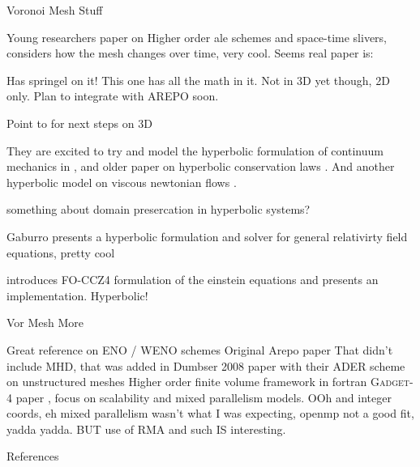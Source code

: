 \documentclass{beamer}
\begin{document}
\begin{frame}{Voronoi Mesh Stuff}
  \begin{outline}
    \1 \cite{Gaburro2021High} Young researchers paper on Higher order ale schemes and space-time slivers, considers how the mesh changes over time, very cool. Seems real paper is:

    \1 \cite{Gaburro2020High} Has springel on it! This one has all the math in it. Not in 3D yet though, 2D only. Plan to integrate with AREPO soon.

    \2 Point to \cite{Re2017Interpolation} for next steps on 3D

    \2 They are excited to try and model the hyperbolic formulation of continuum mechanics in \cite{Dumbser2016High}, and older paper on hyperbolic conservation laws \cite{Dumbser2011Universal}. And another hyperbolic model on viscous newtonian flows \cite{Peshkov2016Hyperbolic}.

    \2 \cite{Guermond2018Second} something about domain presercation in hyperbolic systems?

  \1 \cite{Gaburro2021Well} Gaburro presents a hyperbolic formulation and solver for general relativirty field equations, pretty cool

  \1 \cite{Dumbser2018Conformal} introduces FO-CCZ4 formulation of the einstein equations and presents an implementation. Hyperbolic!

    
  \end{outline}
\end{frame}

\begin{frame}{Vor Mesh More}
\begin{outline}
  \1 Great reference on ENO / WENO schemes \cite{zhang2016eno}
  \1 Original Arepo paper \cite{Springel2010Pur}
  \1 That didn't include MHD, that was added in \cite{pakmor2011mhd}
  \1 Dumbser 2008 paper with their ADER scheme \cite{dumbser2008unified} on unstructured meshes
  \1 Higher order finite volume framework in fortran \cite{antoniadis2022ucns3d}
  \1 \textsc{Gadget-4} paper \cite{springel2021simulating}, focus on scalability and mixed parallelism models. OOh and integer coords, eh mixed parallelism wasn't what I was expecting, openmp not a good fit, yadda yadda. BUT use of RMA and such IS interesting.
\end{outline}
\end{frame}

\begin{frame}[allowframebreaks]{References}
    \tiny
    \printbibliography
\end{frame}
\end{document}
